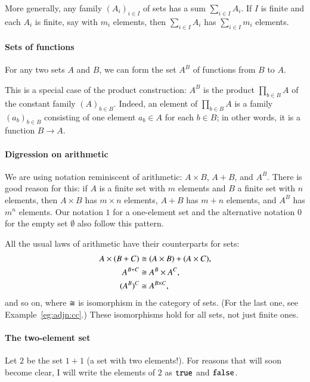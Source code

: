 More generally, any family $(A_i)_{i \in I}$ of sets has a sum $\sum_{i \in
I} A_i$.%
%
%
If $I$ is finite and each $A_i$ is finite, say with $m_i$
elements, then $\sum_{i \in I} A_i$ has $\sum_{i \in I} m_i$ elements.

\paragraph*{Sets of functions}
%
%
%
For any two sets $A$ and $B$, we can form the set $A^B$%
%
%
 of functions from $B$ to $A$.

This is a special case of the product construction: $A^B$ is the product
$\prod_{b \in B} A$ of the constant family $(A)_{b \in B}$.  Indeed, an
element of $\prod_{b \in B} A$ is a family $(a_b)_{b \in B}$ consisting of
one element $a_b \in A$ for each $b \in B$; in other words, it is a function
$B \to A$.

\paragraph*{Digression on arithmetic}%
\label{p:arith}
%
%
We are using notation reminiscent of arithmetic: $A \times B$, $A + B$, and
$A^B$.  There is good reason for this: if $A$ is a finite set with $m$
elements and $B$ a finite set with $n$ elements, then $A \times B$ has $m
\times n$ elements, $A + B$ has $m + n$ elements, and $A^B$ has $m^n$
elements.  Our notation $1$ for a one-element set and the alternative
notation $0$ for the empty set $\emptyset$ also follow this pattern.

All the usual laws of arithmetic have their counterparts for sets:
%
\begin{align*}
A \times (B + C)        &\cong (A \times B) + (A \times C),      \\
A^{B + C}               &\cong A^B \times A^C,                   \\
(A^B)^C                 &\cong A^{B \times C},
\end{align*}
%
and so on, where $\cong$ is isomorphism in the category of sets.  (For the
last one, see Example~\ref{eg:adjn:cc}.)  These isomorphisms hold for all
sets, not just finite ones.

\paragraph*{The two-element set}
%
%
Let $2$%
%
%
be the set $1 + 1$ (a set with two elements!).  For reasons that will soon
become clear, I will write the elements of $2$ as $\texttt{true}$ and $\texttt{false}$.

